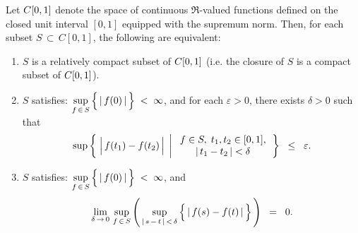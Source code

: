 \begin{theorem}
\label{ArzelaAscoliTheorem}
\mbox{}\vskip 0.1cm
\noindent
Let $C[0,1]$ denote the space of continuous $\Re$-valued functions
defined on the closed unit interval $[0,1]$ equipped with the supremum norm.
Then, for each subset $S \,\subset\, C[0,1]$, the following are equivalent:
\begin{enumerate}
\item	$S$ is a relatively compact subset of $C[0,1]$ (i.e. the closure of $S$ is a compact subset of $C[0,1]$).
\item	$S$ satisfies:\;\;
		$\underset{f\,\in\,S}{\sup}\left\{\,\vert\,\overset{{\color{white}.}}{f}(0)\,\vert\,\right\} \;<\; \infty$, and
		for each $\varepsilon > 0$, there exists $\delta > 0$ such that
		\begin{equation*}
		\sup\left\{\;
		\left\vert\,\overset{{\color{white}.}}{f}(t_{1}) - f(t_{2})\,\right\vert
		\;\left\vert\;
		\begin{array}{c} f \in S, \; t_{1},t_{2} \in [0,1], \\ \vert\,t_{1} - t_{2}\,\vert < \delta \end{array}
		\right.
		\right\}
		\;\;\leq\;\; \varepsilon.
		\end{equation*}
\item	$S$ satisfies:\;\;
		$\underset{f\,\in\,S}{\sup}\left\{\,\vert\,\overset{{\color{white}.}}{f}(0)\,\vert\,\right\} \;<\; \infty$, and
		\begin{equation*}
		\lim_{\delta\,\rightarrow\,0}\,
			\sup_{f\,\in\,S}\left(\,
				\sup_{\vert\,s\,-\,t\,\vert\,<\,\delta} \left\{\,\vert\,\overset{{\color{white}.}}{f}(s) - f(t)\,\vert\,\right\}
			\,\right)
		\;\;=\;\; 0.
		\end{equation*}
\end{enumerate}
\end{theorem}

